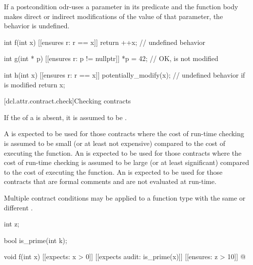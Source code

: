 \pnum
If a postcondition odr-uses
a parameter in its predicate
and the function body makes direct or indirect modifications of
the value of that parameter,
the behavior is undefined.
\begin{example}
\begin{codeblock}
int f(int x)
  [[ensures r: r == x]]
{
  return ++x;                   // undefined behavior
}

int g(int * p)
  [[ensures r: p != nullptr]]
{
  *p = 42;                      // OK,  is not modified
}

int h(int x)
  [[ensures r: r == x]]
{
  potentially_modify(x);        // undefined behavior if  is modified
  return x;
}
\end{codeblock}
\end{example}

[dcl.attr.contract.check]{Checking contracts}

\pnum
If the 
of a  is absent,
it is assumed to be .
\begin{note}
A   is expected to be used
for those contracts where
the cost of run-time checking is assumed to be
small (or at least not expensive) compared to
the cost of executing the function.
An   is expected to be used
for those contracts where
the cost of run-time checking is assumed to be
large (or at least significant) compared to
the cost of executing the function.
An   is expected to be used
for those contracts that are formal comments
and are not evaluated at run-time.
\end{note}

\pnum
\begin{note}
Multiple contract conditions may be applied to a function type
with the same or different .
\begin{example}
\begin{codeblock}
int z;

bool is_prime(int k);

void f(int x)
  [[expects: x > 0]]
  [[expects audit: is_prime(x)]]
  [[ensures: z > 10]]
{
  @\commentellip@
}
\end{codeblock}
\end{example}
\end{note}

